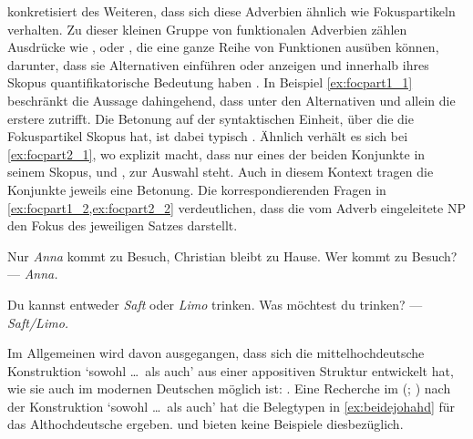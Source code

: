 \citet[425--428]{johannessen2005} konkretisiert des Weiteren, dass sich diese
Adverbien ähnlich wie Fokuspartikeln verhalten. Zu dieser kleinen Gruppe von
funktionalen Adverbien zählen Ausdrücke wie ,  oder
, die eine ganze Reihe von Funktionen ausüben können, darunter, dass
sie Alternativen einführen oder anzeigen und innerhalb ihres Skopus
quantifikatorische Bedeutung haben \autocite[vgl.][1--4, 15]{koenig1991}. In
Beispiel \cref{ex:focpart1_1} beschränkt  die Aussage dahingehend, dass
unter den Alternativen  und  allein die erstere
zutrifft. Die Betonung auf der syntaktischen Einheit, über die die
Fokuspartikel Skopus hat, ist dabei typisch \autocite[10--14]{koenig1991}.
Ähnlich verhält es sich bei \cref{ex:focpart2_1}, wo  explizit
macht, dass nur eines der beiden Konjunkte in seinem Skopus,  und
, zur Auswahl steht. Auch in diesem Kontext tragen die Konjunkte
jeweils eine Betonung. Die korrespondierenden Fragen in
\cref{ex:focpart1_2,ex:focpart2_2} verdeutlichen, dass die vom Adverb
eingeleitete NP den Fokus des jeweiligen Satzes darstellt.

\begin{exe}
\ex\label{ex:focpart_1}
\begin{xlist}
	\ex \label{ex:focpart1_1}
		Nur \emph{Anna} kommt zu Besuch, Christian bleibt zu
		Hause.
	\ex \label{ex:focpart1_2}
		Wer kommt zu Besuch? --- \emph{Anna.}
\end{xlist}

\ex \begin{xlist}
	\ex \label{ex:focpart2_1}
		Du kannst entweder \emph{Saft} oder \emph{Limo} trinken.
	\ex \label{ex:focpart2_2}
		Was möchtest du trinken? --- \emph{Saft/Limo.}
\end{xlist}
\end{exe}

Im Allgemeinen wird davon ausgegangen, dass sich die mittelhochdeutsche
Konstruktion  `sowohl \dots\ als auch' aus einer
appositiven Struktur entwickelt hat, wie sie auch im modernen Deutschen möglich
ist:  \autocite[vgl.][626--627 und die dortigen
Referenzen]{ksw2}. Eine Recherche im  (;
\nosh\cite{ddd}) nach der Konstruktion  `sowohl \dots\
als auch' \autocite[vgl.][49]{schuetzeichel2012} hat die Belegtypen in
\cref{ex:beidejohahd} für das Althochdeutsche ergeben. \citet{braune2018} und
\citet{schrodt2004} bieten keine Beispiele dies\-bezüglich.

